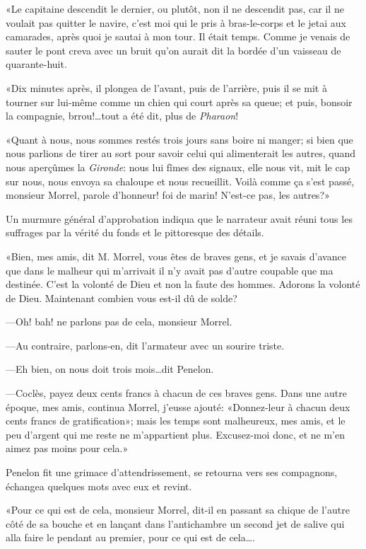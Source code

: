 «Le capitaine descendit le dernier, ou plutôt, non il ne descendit pas, car il ne voulait pas quitter le navire, c'est moi qui le pris à bras-le-corps et le jetai aux camarades, après quoi je sautai à mon tour. Il était temps. Comme je venais de sauter le pont creva avec un bruit qu'on aurait dit la bordée d'un vaisseau de quarante-huit.

«Dix minutes après, il plongea de l'avant, puis de l'arrière, puis il se mit à tourner sur lui-même comme un chien qui court après sa queue; et puis, bonsoir la compagnie, brrou!\dots tout a été dit, plus de \textit{Pharaon}!

«Quant à nous, nous sommes restés trois jours sans boire ni manger; si bien que nous parlions de tirer au sort pour savoir celui qui alimenterait les autres, quand nous aperçûmes la \textit{Gironde}: nous lui fîmes des signaux, elle nous vit, mit le cap sur nous, nous envoya sa chaloupe et nous recueillit. Voilà comme ça s'est passé, monsieur Morrel, parole d'honneur! foi de marin! N'est-ce pas, les autres?»

Un murmure général d'approbation indiqua que le narrateur avait réuni tous les suffrages par la vérité du fonds et le pittoresque des détails.

«Bien, mes amis, dit M. Morrel, vous êtes de braves gens, et je savais d'avance que dans le malheur qui m'arrivait il n'y avait pas d'autre coupable que ma destinée. C'est la volonté de Dieu et non la faute des hommes. Adorons la volonté de Dieu. Maintenant combien vous est-il dû de solde?

—Oh! bah! ne parlons pas de cela, monsieur Morrel.

—Au contraire, parlons-en, dit l'armateur avec un sourire triste.

—Eh bien, on nous doit trois mois\dots dit Penelon.

—Coclès, payez deux cents francs à chacun de ces braves gens. Dans une autre époque, mes amis, continua Morrel, j'eusse ajouté: «Donnez-leur à chacun deux cents francs de gratification»; mais les temps sont malheureux, mes amis, et le peu d'argent qui me reste ne m'appartient plus. Excusez-moi donc, et ne m'en aimez pas moins pour cela.»

Penelon fit une grimace d'attendrissement, se retourna vers ses compagnons, échangea quelques mots avec eux et revint.

«Pour ce qui est de cela, monsieur Morrel, dit-il en passant sa chique de l'autre côté de sa bouche et en lançant dans l'antichambre un second jet de salive qui alla faire le pendant au premier, pour ce qui est de cela\dots.

